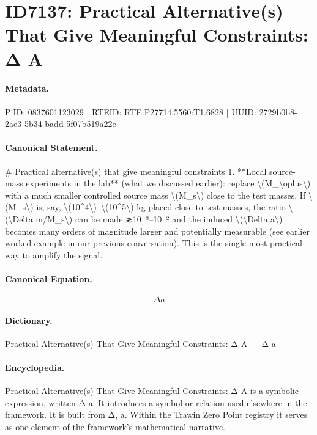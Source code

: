 \section*{ID7137: Practical Alternative(s) That Give Meaningful Constraints: Δ A}
\paragraph{Metadata.}
PiID: 0837601123029 | RTEID: RTE:P27714.5560:T1.6828 | UUID: 2729b0b8-2ae3-5b34-badd-5f07b519a22e

\paragraph{Canonical Statement.}
\# Practical alternative(s) that give meaningful constraints 1. **Local source-mass experiments in the lab** (what we discussed earlier): replace \textbackslash{}(M\_\textbackslash{}oplus\textbackslash{}) with a much smaller controlled source mass \textbackslash{}(M\_s\textbackslash{}) close to the test masses. If \textbackslash{}(M\_s\textbackslash{}) is, say, \textbackslash{}(10\textasciicircum{}4\textbackslash{})–\textbackslash{}(10\textasciicircum{}5\textbackslash{}) kg placed close to test masses, the ratio \textbackslash{}(\textbackslash{}Delta m/M\_s\textbackslash{}) can be made ≳10⁻³–10⁻² and the induced \textbackslash{}(\textbackslash{}Delta a\textbackslash{}) becomes many orders of magnitude larger and potentially measurable (see earlier worked example in our previous conversation). This is the single most practical way to amplify the signal.

\paragraph{Canonical Equation.}
\[
\Delta a
\]

\paragraph{Dictionary.}
Practical Alternative(s) That Give Meaningful Constraints: Δ A — Δ a

\paragraph{Encyclopedia.}
Practical Alternative(s) That Give Meaningful Constraints: Δ A is a symbolic expression, written Δ a. It introduces a symbol or relation used elsewhere in the framework. It is built from Δ, a. Within the Trawin Zero Point registry it serves as one element of the framework's mathematical narrative.
